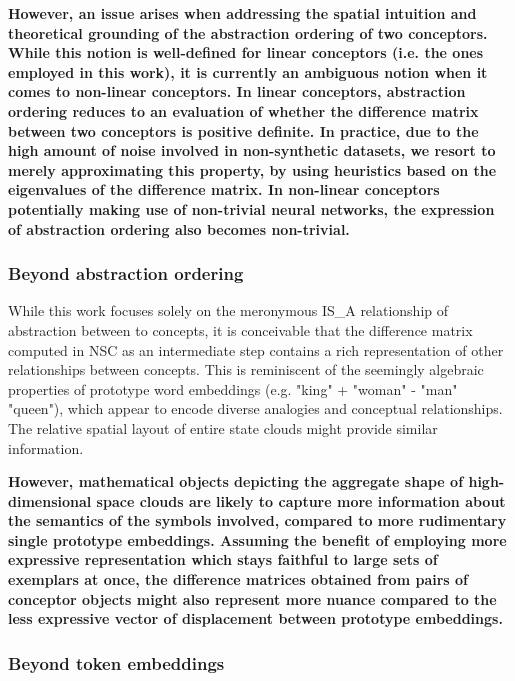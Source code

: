 \textbf{However, an issue arises when addressing the spatial intuition and theoretical grounding of the abstraction ordering of two conceptors. While this notion is well-defined for linear conceptors (i.e. the ones employed in this work), it is currently an ambiguous notion when it comes to non-linear conceptors. In linear conceptors, abstraction ordering reduces to an evaluation of whether the difference matrix between two conceptors is positive definite. In practice, due to the high amount of noise involved in non-synthetic datasets, we resort to merely approximating this property, by using heuristics based on the eigenvalues of the difference matrix. In non-linear conceptors potentially making use of non-trivial neural networks, the expression of abstraction ordering also becomes non-trivial.} 

\subsubsection{Beyond abstraction ordering}

While this work focuses solely on the meronymous IS\_A relationship of abstraction between to concepts, it is conceivable that the difference matrix computed in NSC as an intermediate step contains a rich representation of other relationships between concepts. This is reminiscent of the seemingly algebraic properties of prototype word embeddings (e.g. "king" + "woman" - "man" ~ "queen"), which appear to encode diverse analogies and conceptual relationships. The relative spatial layout of entire state clouds might provide similar information.

\textbf{However, mathematical objects depicting the aggregate shape of high-dimensional space clouds are likely to capture more information about the semantics of the symbols involved, compared to more rudimentary single prototype embeddings. Assuming the benefit of employing more expressive representation which stays faithful to large sets of exemplars at once, the difference matrices obtained from pairs of conceptor objects might also represent more nuance compared to the less expressive vector of displacement between prototype embeddings.} 

\subsubsection{Beyond token embeddings}

